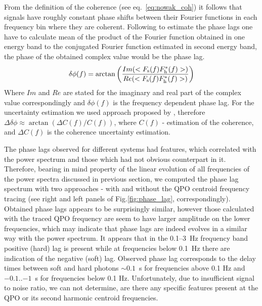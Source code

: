\documentclass[a4paper,fleqn,usenatbib]{mnras}
\begin{document}
From the definition of the coherence (see eq.~\ref{eq:nowak_coh}) it follows that signals have roughly constant phase shifts between their Fourier functions in each frequency bin where they are coherent. 
Following  to estimate the phase lags one have to calculate mean of the product of the Fourier function obtained in one energy band to the conjugated Fourier function estimated in second energy band, the phase of the obtained complex value would be the phase lag. 
\begin{equation}
      \delta \phi(f) = \arctan{\left(\frac{Im(<F_{\rm s}(f) F_{\rm h}^{*}(f)>)}{Re(<F_{\rm s}(f) F_{\rm h}^{*}(f)>)}\right)}
\end{equation}
Where $Im$ and $Re$ are stated for the imaginary and real part of the complex value correspondingly and $\delta \phi(f)$ is the frequency dependent phase lag. 
For the uncertainty estimation we used approach proposed by \citet{2014A&ARv..22...72U}, therefore $\Delta\delta\phi \approx \arctan{(\Delta C(f)/C(f))}$, where $C(f)$ - estimation of the coherence, and $\Delta C(f)$ is the coherence uncertainty estimation.

The phase lags observed for different systems had features, which correlated with the power spectrum and those which had not obvious counterpart in it. 
Therefore, bearing in mind property of the linear evolution of all frequencies of the power spectra discussed in previous section, we computed the phase lag spectrum with two approaches - with and without the QPO centroid frequency tracing (see right and left panels of Fig.\ref{fig:phase_lag}, correspondingly).
Obtained phase lags appears to be surprisingly similar, however those calculated with the traced QPO frequency are seem to have larger amplitude on the lower frequencies, which may indicate that phase lags are indeed evolves in a similar way with the power spectrum. 
It appears that in the 0.1--3~Hz frequency band positive (hard) lag is present while at frequencies below 0.1~Hz there are indication of the negative (soft) lag.
Observed phase lag corresponds to the delay times between soft and hard photons $\sim0.1$~s for frequencies above 0.1 Hz and $-0.1$..$-1$~s for frequencies below 0.1 Hz.
Unfortunately, due to insufficient signal to noise ratio, we can not determine, are there any specific features present at the QPO or its second harmonic centroid frequencies.    
\end{document}
